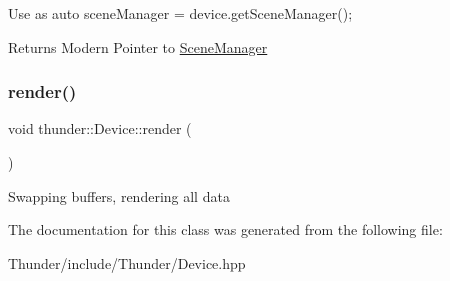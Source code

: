 Use as {\ttfamily auto scene\+Manager = device.\+get\+Scene\+Manager();} \begin{DoxyReturn}{Returns}
Modern Pointer to \mbox{\hyperlink{classthunder_1_1_scene_manager}{Scene\+Manager}} 
\end{DoxyReturn}
\mbox{\label{classthunder_1_1_device_a88fd3ad1c16d755cca56e031cbd137d4}} 
\subsubsection{\texorpdfstring{render()}{render()}}
{\footnotesize\ttfamily void thunder\+::\+Device\+::render (\begin{DoxyParamCaption}{ }\end{DoxyParamCaption})}

Swapping buffers, rendering all data 

The documentation for this class was generated from the following file\+:\begin{DoxyCompactItemize}
\item 
Thunder/include/\+Thunder/Device.\+hpp\end{DoxyCompactItemize}
